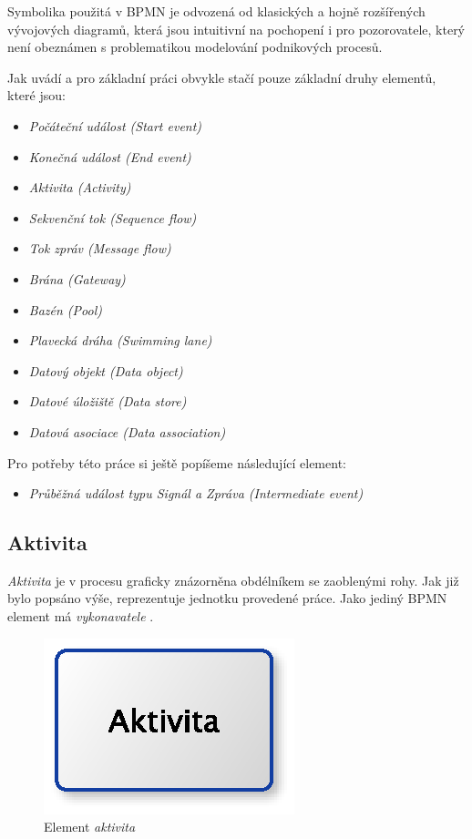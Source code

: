 Symbolika použitá v BPMN je odvozená od klasických a hojně rozšířených vývojových diagramů, která jsou intuitivní na pochopení i pro pozorovatele, který není obeznámen s problematikou modelování podnikových procesů.

Jak uvádí \cite{Silver2011} a \cite{Vasicek2008} pro základní práci obvykle stačí pouze základní druhy elementů, které jsou:

\begin{itemize}
\item \textit{Počáteční událost (Start event)}
\item \textit{Konečná událost (End event)}
\item \textit{Aktivita (Activity)}
\item \textit{Sekvenční tok (Sequence flow)}
\item \textit{Tok zpráv (Message flow)}
\item \textit{Brána (Gateway)}
\item \textit{Bazén (Pool)}
\item \textit{Plavecká dráha (Swimming lane)}
\item \textit{Datový objekt (Data object)}
\item \textit{Datové úložiště (Data store)}
\item \textit{Datová asociace (Data association)}
\end{itemize}

Pro potřeby této práce si ještě popíšeme následující element:

\begin{itemize}
\item \textit{Průběžná událost typu Signál a Zpráva (Intermediate event)}
\end{itemize}

\subsection{Aktivita}
\textit{Aktivita} je v procesu graficky znázorněna obdélníkem se zaoblenými rohy. Jak již bylo popsáno výše, reprezentuje jednotku provedené práce. Jako jediný BPMN element má \textit{vykonavatele} \cite{Silver2011}. 

\begin{figure}[H]\centering
\includegraphics{obrazky/activity}
\caption{Element \textit{aktivita}}
\label{fig:aktivita}
\end{figure}

